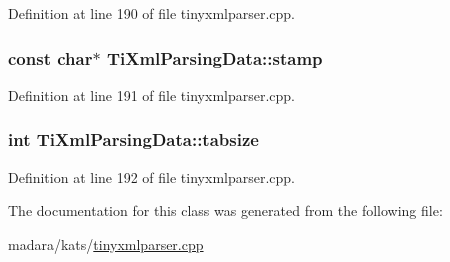 Definition at line 190 of file tinyxmlparser.cpp.

\hypertarget{classTiXmlParsingData_a0e3c2ea5a8b738d733735ca0318fe4ff}{
\subsubsection[{stamp}]{\setlength{\rightskip}{0pt plus 5cm}const char$\ast$ {\bf TiXmlParsingData::stamp}}}
\label{d6/d7d/classTiXmlParsingData_a0e3c2ea5a8b738d733735ca0318fe4ff}


Definition at line 191 of file tinyxmlparser.cpp.

\hypertarget{classTiXmlParsingData_ab9d6aea2833e38aaef440e49c22a05ca}{
\subsubsection[{tabsize}]{\setlength{\rightskip}{0pt plus 5cm}int {\bf TiXmlParsingData::tabsize}}}
\label{d6/d7d/classTiXmlParsingData_ab9d6aea2833e38aaef440e49c22a05ca}


Definition at line 192 of file tinyxmlparser.cpp.



The documentation for this class was generated from the following file:\begin{DoxyCompactItemize}
\item 
madara/kats/\hyperlink{tinyxmlparser_8cpp}{tinyxmlparser.cpp}\end{DoxyCompactItemize}
